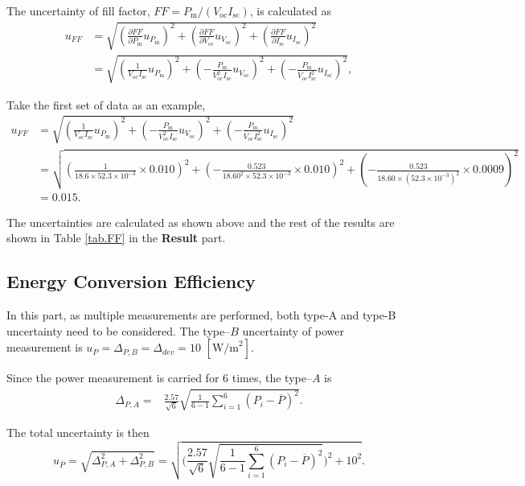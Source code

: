 \documentclass{article}
\begin{document}
{\begin{appendix}
The uncertainty of fill factor, $FF = P_\text{m}/(V_\text{oc}I_\text{sc})$, is calculated as
\begin{align*}
    u_{FF} & = \sqrt{(\frac{\partial FF}{\partial P_\text{m}}u_{P_\text{m}})^2 + (\frac{\partial FF}{\partial V_\text{oc}}u_{V_\text{oc}})^2 + (\frac{\partial FF}{\partial I_\text{sc}}u_{I_\text{sc}})^2}   \\
           & = \sqrt{(\frac{1}{V_\text{oc}I_\text{sc}}u_{P_\text{m}})^2 + (-\frac{P_\text{m}}{V_\text{oc}^2I_\text{sc}}u_{V_\text{oc}})^2 + (-\frac{P_\text{m}}{V_\text{oc}I_\text{sc}^2}u_{I_\text{sc}})^2},
\end{align*}

Take the first set of data as an example,
\begin{align*}
    u_{FF} & = \sqrt{(\frac{1}{V_\text{oc}I_\text{sc}}u_{P_\text{m}})^2 + (-\frac{P_\text{m}}{V_\text{oc}^2I_\text{sc}}u_{V_\text{oc}})^2 + (-\frac{P_\text{m}}{V_\text{oc}I_\text{sc}^2}u_{I_\text{sc}})^2}      \\
           & = \sqrt{(\frac{1}{18.6\times 52.3\times 10^{-3}}\times 0.010)^2 + (-\frac{0.523}{18.60^2\times 52.3\times 10^{-3}}\times 0.010)^2 + (-\frac{0.523}{18.60\times (52.3\times 10^{-3})^2}\times 0.0009)^2} \\
           & = 0.015.
\end{align*}

The uncertainties are calculated as shown above and the rest of the results are shown in Table \ref{tab.FF} in the \textbf{Result} part.

\subsection{Energy Conversion Efficiency }
In this part, as multiple measurements are performed, both type-A and type-B uncertainty need to be considered. The type--$B$ uncertainty of power measurement is $u_{P} = \Delta_{P,B} = \Delta_{dev} = 10\,\,[\text{W/m}^2]$. 

Since the power measurement is carried for 6 times, the type--$A$ is
\begin{align*}
    \Delta_{P,A}
    =    & \frac{2.57}{\sqrt{6}}\sqrt{\frac{1}{6-1}\sum \limits_{i=1}^{6}(P_i-\overline{P})^2}.
\end{align*}

The total uncertainty is then
$$u_{\overline{P}} = \sqrt{\Delta_{P,A}^2+\Delta_{P,B}^2} = \sqrt{\bigg(\frac{2.57}{\sqrt{6}}\sqrt{\frac{1}{6-1}\sum \limits_{i=1}^{6}(P_i-\overline{P})^2}\bigg)^2+10^2}.$$


\end{appendix}}
\end{document}
